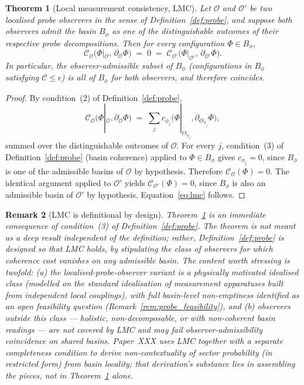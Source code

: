 \documentclass[12pt]{article}
\newtheorem{theorem}{Theorem}
\newtheorem{remark}[theorem]{Remark}
\newcommand{\Ocal}{\mathcal{O}}
\newcommand{\Ccal}{\mathcal{C}}
\begin{document}
\begin{theorem}[Local measurement consistency, LMC]\label{thm:lmc}
Let $\Ocal$ and $\Ocal'$ be two localised probe observers in the sense of Definition~\ref{def:probe}, and suppose both observers admit the basin $B_\phi$ as one of the distinguishable outcomes of their respective probe decompositions. Then for every configuration $\Phi \in B_\phi$,
\begin{equation}\label{eq:lmc}
    \Ccal_\Ocal\!\bigl(\Phi|_\Ocal,\, \partial_\Ocal \Phi\bigr)
    \;=\; 0
    \;=\; \Ccal_{\Ocal'}\!\bigl(\Phi|_{\Ocal'},\, \partial_{\Ocal'} \Phi\bigr).
\end{equation}
In particular, the observer-admissible subset of $B_\phi$ (configurations in $B_\phi$ satisfying $\Ccal \leq \epsilon$) is all of $B_\phi$ for both observers, and therefore coincides.
\end{theorem}

\begin{proof}
By condition~(2) of Definition~\ref{def:probe},
\begin{equation}
    \Ccal_\Ocal\!\bigl(\Phi|_\Ocal, \partial_\Ocal \Phi\bigr)
    \;=\; \sum_{j} c_{\phi_j}\!\bigl(\Phi|_{O_{\phi_j}}, \partial_{O_{\phi_j}}\Phi\bigr),
\end{equation}
summed over the distinguishable outcomes of $\Ocal$. For every $j$, condition~(3) of Definition~\ref{def:probe} (basin coherence) applied to $\Phi \in B_\phi$ gives $c_{\phi_j} = 0$, since $B_\phi$ is one of the admissible basins of $\Ocal$ by hypothesis. Therefore $\Ccal_\Ocal(\Phi) = 0$. The identical argument applied to $\Ocal'$ yields $\Ccal_{\Ocal'}(\Phi) = 0$, since $B_\phi$ is also an admissible basin of $\Ocal'$ by hypothesis. Equation~\eqref{eq:lmc} follows.
\end{proof}

\begin{remark}[LMC is definitional by design]\label{rem:lmc_definitional}
Theorem~\ref{thm:lmc} is an immediate consequence of condition~(3) of Definition~\ref{def:probe}. The theorem is not meant as a deep result independent of the definition; rather, Definition~\ref{def:probe} is \emph{designed} so that LMC holds, by stipulating the class of observers for which coherence cost vanishes on any admissible basin. The content worth stressing is twofold: (a) the localised-probe-observer variant is a physically motivated idealised class (modelled on the standard idealisation of measurement apparatuses built from independent local couplings), with full basin-level non-emptiness identified as an open feasibility question (Remark~\ref{rem:probe_feasibility}), and (b) observers outside this class --- holistic, non-decomposable, or with non-coherent basin readings --- are not covered by LMC and may fail observer-admissibility coincidence on shared basins. Paper~XXX uses LMC together with a separate completeness condition to derive non-contextuality of sector probability (in restricted form) from basin locality; that derivation's substance lies in assembling the pieces, not in Theorem~\ref{thm:lmc} alone.
\end{remark}
\end{document}
